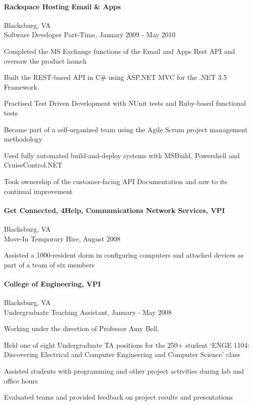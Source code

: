 \documentclass[10pt]{article}
\begin{document}
\paragraph*{Rackspace Hosting Email \& Apps}
Blacksburg, VA\\
Software Developer Part-Time, January 2009 - May 2010
\begin{compactitem}
\item Completed the MS Exchange functions of the Email and Apps Rest API and oversaw the product launch
\item Built the REST-based API in C\# using ASP.NET MVC for the .NET 3.5 Framework
\item Practised Test Driven Development with NUnit tests and Ruby-based functional tests
\item Became part of a self-organized team using the Agile Scrum project management methodology
\item Used fully automated build-and-deploy systems with MSBuild, Powershell and CruiseControl.NET
\item Took ownership of the customer-facing API Documentation and saw to its continual improvement \end{compactitem}

{
\paragraph*{Get Connected, 4Help, Communications Network Services, VPI}
Blacksburg, VA\\
Move-In Temporary Hire, August 2008
\begin{compactitem}
\item Assisted a 1000-resident dorm in configuring computers and attached devices as part of a team of six members
\end{compactitem}
}{}

\paragraph*{College of Engineering, VPI}
Blacksburg, VA\\
Undergraduate Teaching Assistant, January - May 2008
{
\begin{compactitem}
\item Working under the direction of Professor Amy Bell,
\item Held one of eight Undergraduate TA positions for the 250+ student ‘ENGE 1104: Discovering Electrical and Computer Engineering and Computer Science’ class
\item Assisted students with programming and other project activities during lab and office hours
\item Evaluated teams and provided feedback on project results and presentations
\end{compactitem}
}{}
\end{document}
